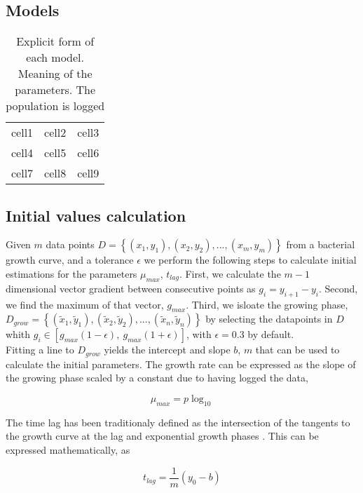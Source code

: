 \documentclass[titlepage,11pt]{article}
\begin{document}
\begin{linenumbers}
		\subsection{Models}
		\begin{linenomath*}
			\begin{table}[h]
				\centering
				\begin{tabular}{ c c c }
					cell1 & cell2 & cell3 \\ 
					cell4 & cell5 & cell6 \\  
					cell7 & cell8 & cell9    
				\end{tabular}
				\caption{\label{tab:model_eqs}Explicit form of each model. Meaning of the parameters. The population is logged}
			\end{table}
		\end{linenomath*}
		
		\subsection{Initial values calculation}\label{subsec:initial_values}
		Given $ m $ data points $ D =  \left\{(x_1, y_1), (x_2, y_2), ... , (x_m, y_m)\right\} $ from a bacterial growth curve, and a tolerance $ \epsilon $ we perform the following steps to calculate initial estimations for the parameters $ \mu_{max} $, $ t_{lag} $. First, we calculate the $ m - 1 $ dimensional vector gradient between consecutive points as $ g_i = y_{i+1} - y_i $. Second, we find the maximum of that vector, $ g_{max} $. Third, we isloate the growing phase, $ D_{grow} = \left\{(\tilde{x}_1, \tilde{y}_1), (\tilde{x}_2, \tilde{y}_2), ... , (\tilde{x}_n, \tilde{y}_n)\right\} $ by selecting the datapoints in $ D $ whith $g_i \in [g_{max}(1-\epsilon), \ g_{max}(1+\epsilon)]$, with $ \epsilon = 0.3 $ by default.\\
		Fitting a line to $ D_{grow} $ yields the intercept and slope $ b $, $ m $ that can be used to calculate the initial parameters. The growth rate can be expressed as the slope of the growing phase scaled by a constant due to having logged the data, 
		\begin{linenomath*}
			\begin{equation}
			\mu_{max}  = p\log_{10}
			\end{equation}
		\end{linenomath*}
		
		The time lag has been traditionaly defined as the intersection of the tangents to the growth curve at the lag and exponential growth phases \cite{Micha2011}. This can be expressed mathematically, as 
		\begin{linenomath*}
			\begin{equation}
			t_{lag} = \frac{1}{m}(y_0 - b)
			\end{equation}
		\end{linenomath*}
		

\end{linenumbers}
\end{document}
